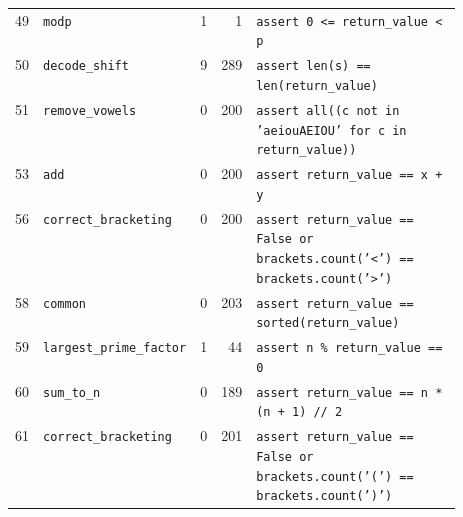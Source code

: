 \begin{footnotesize}
\begin{longtable}{@{}r l r r p{0.52\linewidth}@{}}
49 & \texttt{modp} & 1 & 1 & \texttt{assert \allowbreak{}0 \allowbreak{}<\allowbreak{}=\allowbreak{} \allowbreak{}return\_value \allowbreak{}<\allowbreak{} \allowbreak{}p} \\
50 & \texttt{decode\_shift} & 9 & 289 & \texttt{assert \allowbreak{}len(\allowbreak{}s)\allowbreak{} \allowbreak{}=\allowbreak{}=\allowbreak{} \allowbreak{}len(\allowbreak{}return\_value)\allowbreak{}} \\
51 & \texttt{remove\_vowels} & 0 & 200 & \texttt{assert \allowbreak{}all(\allowbreak{}(\allowbreak{}c \allowbreak{}not \allowbreak{}in \allowbreak{}'\allowbreak{}aeiouAEIOU'\allowbreak{} \allowbreak{}for \allowbreak{}c \allowbreak{}in \allowbreak{}return\_value)\allowbreak{})\allowbreak{}} \\
53 & \texttt{add} & 0 & 200 & \texttt{assert \allowbreak{}return\_value \allowbreak{}=\allowbreak{}=\allowbreak{} \allowbreak{}x \allowbreak{}+\allowbreak{} \allowbreak{}y} \\
56 & \texttt{correct\_bracketing} & 0 & 200 & \texttt{assert \allowbreak{}return\_value \allowbreak{}=\allowbreak{}=\allowbreak{} \allowbreak{}False \allowbreak{}or \allowbreak{}brackets.\allowbreak{}count(\allowbreak{}'\allowbreak{}<\allowbreak{}'\allowbreak{})\allowbreak{} \allowbreak{}=\allowbreak{}=\allowbreak{} \allowbreak{}brackets.\allowbreak{}count(\allowbreak{}'\allowbreak{}>\allowbreak{}'\allowbreak{})\allowbreak{}} \\
58 & \texttt{common} & 0 & 203 & \texttt{assert \allowbreak{}return\_value \allowbreak{}=\allowbreak{}=\allowbreak{} \allowbreak{}sorted(\allowbreak{}return\_value)\allowbreak{}} \\
59 & \texttt{largest\_prime\_factor} & 1 & 44 & \texttt{assert \allowbreak{}n \allowbreak{}\% \allowbreak{}return\_value \allowbreak{}=\allowbreak{}=\allowbreak{} \allowbreak{}0} \\
60 & \texttt{sum\_to\_n} & 0 & 189 & \texttt{assert \allowbreak{}return\_value \allowbreak{}=\allowbreak{}=\allowbreak{} \allowbreak{}n \allowbreak{}*\allowbreak{} \allowbreak{}(\allowbreak{}n \allowbreak{}+\allowbreak{} \allowbreak{}1)\allowbreak{} \allowbreak{}/\allowbreak{}/\allowbreak{} \allowbreak{}2} \\
61 & \texttt{correct\_bracketing} & 0 & 201 & \texttt{assert \allowbreak{}return\_value \allowbreak{}=\allowbreak{}=\allowbreak{} \allowbreak{}False \allowbreak{}or \allowbreak{}brackets.\allowbreak{}count(\allowbreak{}'\allowbreak{}(\allowbreak{}'\allowbreak{})\allowbreak{} \allowbreak{}=\allowbreak{}=\allowbreak{} \allowbreak{}brackets.\allowbreak{}count(\allowbreak{}'\allowbreak{})\allowbreak{}'\allowbreak{})\allowbreak{}} \\

\end{longtable}
\end{footnotesize}
